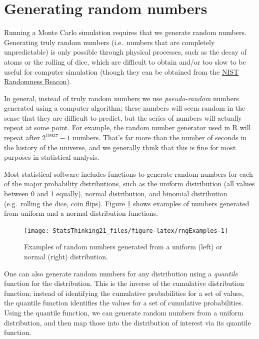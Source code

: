 \documentclass[
  12pt,
]{book}
\begin{document}
\hypertarget{generating-random-numbers}{%
\section{Generating random numbers}\label{generating-random-numbers}}

Running a Monte Carlo simulation requires that we generate random numbers. Generating truly random numbers (i.e.~numbers that are completely unpredictable) is only possible through physical processes, such as the decay of atoms or the rolling of dice, which are difficult to obtain and/or too slow to be useful for computer simulation (though they can be obtained from the \href{https://www.nist.gov/programs-projects/nist-randomness-beacon\%5D}{NIST Randomness Beacon}).

In general, instead of truly random numbers we use \emph{pseudo-random} numbers generated using a computer algorithm; these numbers will seem random in the sense that they are difficult to predict, but the series of numbers will actually repeat at some point. For example, the random number generator used in R will repeat after \(2^{19937} - 1\) numbers. That's far more than the number of seconds in the history of the universe, and we generally think that this is fine for most purposes in statistical analysis.

Most statistical software includes functions to generate random numbers for each of the major probability distributions, such as the uniform distribution (all values between 0 and 1 equally), normal distribution, and binomial distribution (e.g.~rolling the dice, coin flips). Figure \ref{fig:rngExamples} shows examples of numbers generated from uniform and a normal distribution functions.

\begin{figure}
\texttt{[image: StatsThinking21\_files/figure-latex/rngExamples-1]} \caption{Examples of random numbers generated from a uniform (left) or normal (right) distribution.}\label{fig:rngExamples}
\end{figure}

One can also generate random numbers for any distribution using a \emph{quantile} function for the distribution. This is the inverse of the cumulative distribution function; instead of identifying the cumulative probabilities for a set of values, the quantile function identifies the values for a set of cumulative probabilities. Using the quantile function, we can generate random numbers from a uniform distribution, and then map those into the distribution of interest via its quantile function.
\end{document}
